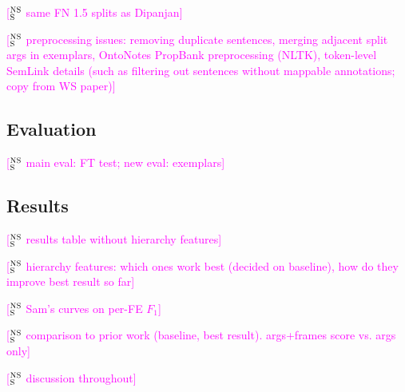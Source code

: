 \documentclass[11pt,a4paper]{article}
\newcommand{\ensuretext}[1]{#1}
\newcommand{\nssmarker}{\ensuretext{\textcolor{magenta}{\ensuremath{^{\textsc{NS}}_{\textsc{S}}}}}}
\newcommand{\arkcomment}[3]{\ensuretext{\textcolor{#3}{[#1 #2]}}}
\newcommand{\nss}[1]{\arkcomment{\nssmarker}{#1}{magenta}}
\begin{document}
\nss{same FN 1.5 splits as Dipanjan}


\nss{preprocessing issues: removing duplicate sentences, merging adjacent split args in exemplars, OntoNotes PropBank preprocessing (NLTK), token-level SemLink details (such as filtering out sentences without mappable annotations; copy from WS paper)}

\subsection{Evaluation}

\nss{main eval: FT test; new eval: exemplars}

\subsection{Results}

\nss{results table without hierarchy features}

\nss{hierarchy features: which ones work best (decided on baseline), how do they improve best result so far}

\nss{Sam's curves on per-FE $F_1$}

\nss{comparison to prior work (baseline, best result). args+frames score vs. args only}

\nss{discussion throughout}

% 
\end{document}
